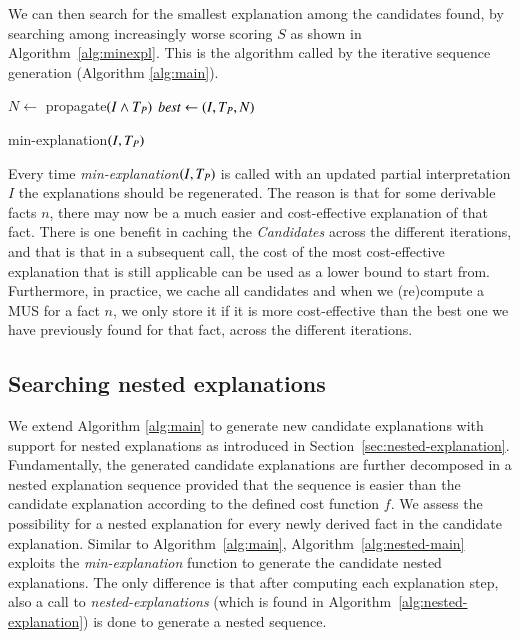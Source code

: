 We can then search for the smallest explanation among the candidates found, by searching among increasingly worse scoring $S$ as shown in Algorithm~\ref{alg:minexpl}. This is the algorithm called by the iterative sequence generation (Algorithm \ref{alg:main}).

\begin{algorithm}
	\DontPrintSemicolon
  $N \gets$ propagate$(I \wedge T_P)$\;
  $\mathit{best}\gets (I, T_P, N)$\;
  \caption{min-explanation$(I,T_P)$}
  \label{alg:minexpl}
\end{algorithm}

Every time \textit{min-explanation$(I,T_P)$} is called with an updated partial interpretation $I$ the explanations should be regenerated. The reason is that for some derivable facts $n$, there may now be a much easier and cost-effective explanation of that fact.
There is one benefit in caching the \textit{Candidates} across the different iterations, and that is that in a subsequent call, the cost of the most cost-effective explanation that is still applicable can be used as a lower bound to start from.
Furthermore, in practice, we cache all candidates and when we (re)compute a MUS for a fact $n$, we only store it if it is more cost-effective than the best one we have previously found for that fact, across the different iterations.


\subsection{Searching nested explanations}

We extend Algorithm \ref{alg:main} to generate new candidate explanations with support for nested explanations as introduced in Section~\ref{sec:nested-explanation}.
Fundamentally, the generated candidate explanations are further decomposed in a nested explanation sequence provided that the sequence is easier than the candidate explanation according to the defined cost function $f$. 
We assess the possibility for a nested explanation for every newly derived fact in the candidate explanation. 
Similar to Algorithm~\ref{alg:main}, Algorithm~\ref{alg:nested-main} exploits the \textit{min-explanation} function to generate the candidate nested explanations. 
The only difference is that after computing each explanation step, also a call to \textit{nested-explanations} (which is found in Algorithm~\ref{alg:nested-explanation}) is done to generate a nested sequence. 


